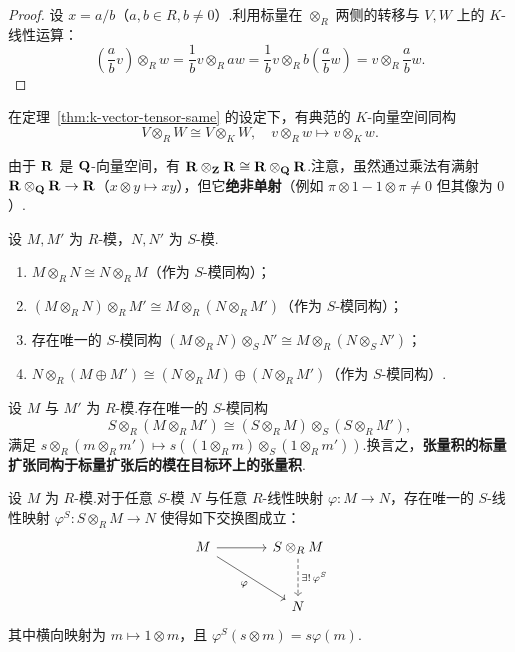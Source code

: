 \begin{proof}
设 $x = a/b$（$a, b \in R, b \neq 0$）.利用标量在 $\otimes_R$ 两侧的转移与 $V, W$ 上的 $K$-线性运算：
\[
  \left(\frac{a}{b}v\right) \otimes_R w = \frac{1}{b}v \otimes_R aw = \frac{1}{b}v \otimes_R b\left(\frac{a}{b}w\right) = v \otimes_R \frac{a}{b}w.
\]
\end{proof}

\begin{corollary}\label{cor:v-tensor-r-w-k}
在定理~\ref{thm:k-vector-tensor-same} 的设定下，有典范的 $K$-向量空间同构
\[
  V \otimes_R W \cong V \otimes_K W, \quad v \otimes_R w \mapsto v \otimes_K w.
\]
\end{corollary}

\begin{example}\label{ex:r-tensor-z-r}
由于 $\mathbf{R}$ 是 $\mathbf{Q}$-向量空间，有 $\mathbf{R} \otimes_{\mathbf{Z}} \mathbf{R} \cong \mathbf{R} \otimes_{\mathbf{Q}} \mathbf{R}$.注意，虽然通过乘法有满射 $\mathbf{R} \otimes_{\mathbf{Q}} \mathbf{R} \to \mathbf{R}$（$x \otimes y \mapsto xy$），但它\textbf{绝非单射}（例如 $\pi \otimes 1 - 1 \otimes \pi \neq 0$ 但其像为 $0$）.
\end{example}

\begin{theorem}\label{thm:s-module-assoc-collection}
设 $M, M'$ 为 $R$-模，$N, N'$ 为 $S$-模.
\begin{enumerate}
  \item $M \otimes_R N \cong N \otimes_R M$（作为 $S$-模同构）；
  \item $(M \otimes_R N) \otimes_R M' \cong M \otimes_R (N \otimes_R M')$（作为 $S$-模同构）；
  \item 存在唯一的 $S$-模同构 $(M \otimes_R N) \otimes_S N' \cong M \otimes_R (N \otimes_S N')$；
  \item $N \otimes_R (M \oplus M') \cong (N \otimes_R M) \oplus (N \otimes_R M')$（作为 $S$-模同构）.
\end{enumerate}
\end{theorem}

\begin{corollary}\label{cor:base-ext-of-tensor}
设 $M$ 与 $M'$ 为 $R$-模.存在唯一的 $S$-模同构
\[
  S \otimes_R (M \otimes_R M') \cong (S \otimes_R M) \otimes_S (S \otimes_R M'),
\]
满足 $s \otimes_R (m \otimes_R m') \mapsto s((1 \otimes_R m) \otimes_S (1 \otimes_R m'))$.换言之，\textbf{张量积的标量扩张同构于标量扩张后的模在目标环上的张量积}.
\end{corollary}

\begin{theorem}[基变换的普遍映射性质]\label{thm:base-ext-ump}
设 $M$ 为 $R$-模.对于任意 $S$-模 $N$ 与任意 $R$-线性映射 $\varphi \colon M \to N$，存在唯一的 $S$-线性映射 $\varphi^S \colon S \otimes_R M \to N$ 使得如下交换图成立：
\begin{equation}
\begin{tikzcd}[row sep=large, column sep=large]
M \arrow[r] \arrow[dr, "\varphi"'] & S \otimes_R M \arrow[d, "\exists!\,\varphi^S", dashed] \\
& N
\end{tikzcd}
\end{equation}
其中横向映射为 $m \mapsto 1 \otimes m$，且 $\varphi^S(s \otimes m) = s\varphi(m)$.
\end{theorem}

